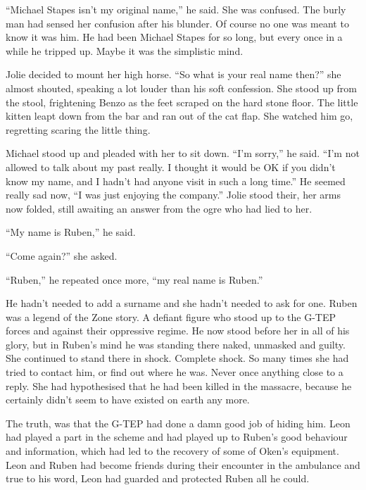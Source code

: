 ``Michael Stapes isn't my original name,'' he said.  She was confused.  The burly man had sensed her confusion after his blunder.  Of course no one was meant to know it was him.  He had been Michael Stapes for so long, but every once in a while he tripped up.  Maybe it was the simplistic mind.  

Jolie decided to mount her high horse.  ``So what is your real name then?'' she almost shouted, speaking a lot louder than his soft confession.  She stood up from the stool, frightening Benzo as the feet scraped on the hard stone floor.  The little kitten leapt down from the bar and ran out of the cat flap.  She watched him go, regretting scaring the little thing.  

Michael stood up and pleaded with her to sit down.  ``I'm sorry,'' he said.  ``I'm not allowed to talk about my past really.  I thought it would be OK if you didn't know my name, and I hadn't had anyone visit in such a long time.''  He seemed really sad now, ``I was just enjoying the company.''  Jolie stood their, her arms now folded, still awaiting an answer from the ogre who had lied to her.

``My name is Ruben,'' he said.  

``Come again?'' she asked.

``Ruben,'' he repeated once more, ``my real name is Ruben.''  

He hadn't needed to add a surname and she hadn't needed to ask for one.  Ruben was a legend of the Zone story.  A defiant figure who stood up to the G-TEP forces and against their oppressive regime.  He now stood before her in all of his glory, but in Ruben's mind he was standing there naked, unmasked and guilty.  She continued to stand there in shock.  Complete shock.  So many times she had tried to contact him, or find out where he was.  Never once anything close to a reply.  She had hypothesised that he had been killed in the massacre, because he certainly didn't seem to have existed on earth any more.    



\thoughtbreak



The truth, was that the G-TEP had done a damn good job of hiding him.  Leon had played a part in the scheme and had played up to Ruben's good behaviour and information, which had led to the recovery of some of Oken's equipment.  Leon and Ruben had become friends during their encounter in the ambulance and true to his word, Leon had guarded and protected Ruben all he could.  

